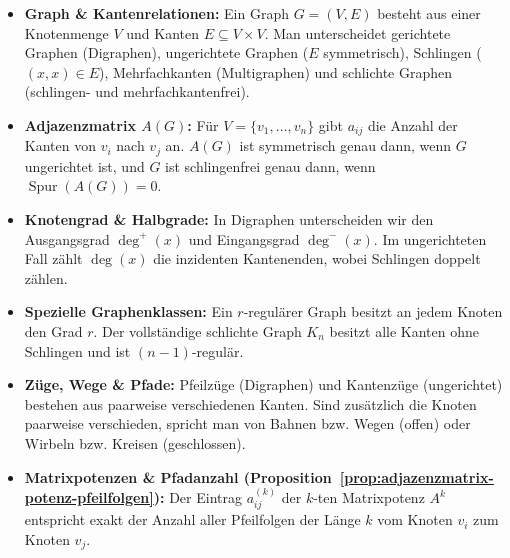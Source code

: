 \begin{nice-box}
\begin{itemize}
    \item \textbf{Graph \& Kantenrelationen:} Ein Graph $G = (V, E)$ besteht aus einer Knotenmenge $V$ und Kanten $E \subseteq V \times V$. Man unterscheidet gerichtete Graphen (Digraphen), ungerichtete Graphen ($E$ symmetrisch), Schlingen ($(x,x) \in E$), Mehrfachkanten (Multigraphen) und schlichte Graphen (schlingen- und mehrfachkantenfrei).
    \item \textbf{Adjazenzmatrix $A(G)$:} Für $V = \{v_1, \dots, v_n\}$ gibt $a_{ij}$ die Anzahl der Kanten von $v_i$ nach $v_j$ an. $A(G)$ ist symmetrisch genau dann, wenn $G$ ungerichtet ist, und $G$ ist schlingenfrei genau dann, wenn $\operatorname{Spur}(A(G)) = 0$.
    \item \textbf{Knotengrad \& Halbgrade:} In Digraphen unterscheiden wir den Ausgangsgrad $\operatorname{deg}^+(x)$ und Eingangsgrad $\operatorname{deg}^-(x)$. Im ungerichteten Fall zählt $\operatorname{deg}(x)$ die inzidenten Kantenenden, wobei Schlingen doppelt zählen.
    \item \textbf{Spezielle Graphenklassen:} Ein $r$-regulärer Graph besitzt an jedem Knoten den Grad $r$. Der vollständige schlichte Graph $K_n$ besitzt alle Kanten ohne Schlingen und ist $(n-1)$-regulär.
    \item \textbf{Züge, Wege \& Pfade:} Pfeilzüge (Digraphen) und Kantenzüge (ungerichtet) bestehen aus paarweise verschiedenen Kanten. Sind zusätzlich die Knoten paarweise verschieden, spricht man von Bahnen bzw. Wegen (offen) oder Wirbeln bzw. Kreisen (geschlossen).
    \item \textbf{Matrixpotenzen \& Pfadanzahl (Proposition~\ref{prop:adjazenzmatrix-potenz-pfeilfolgen}):} Der Eintrag $a_{ij}^{(k)}$ der $k$-ten Matrixpotenz $A^k$ entspricht exakt der Anzahl aller Pfeilfolgen der Länge $k$ vom Knoten $v_i$ zum Knoten $v_j$.
\end{itemize}
\end{nice-box}